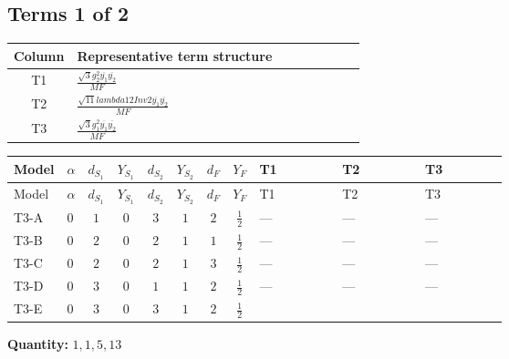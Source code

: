 \documentclass[8pt]{article}
\begin{document}
\begin{landscape}
\subsection*{Terms 1 of 2}
\begin{center}
\begin{tabular}{@{}c >{\raggedright\arraybackslash}p{0.82\linewidth}@{}}
\toprule
Column & Representative term structure \\
\midrule
T1 & \(\displaystyle \frac{\sqrt{3} g_{2}^{2} \overline{y_{1}} \overline{y_{2}}}{MF}\) \\
\midrule
T2 & \(\displaystyle \frac{\sqrt{11} lambda12Inv2 \overline{y_{1}} \overline{y_{2}}}{MF}\) \\
\midrule
T3 & \(\displaystyle \frac{\sqrt{3} g_{1}^{2} \overline{y_{1}} \overline{y_{2}}}{MF}\) \\
\midrule
\bottomrule
\end{tabular}
\end{center}
\smallskip
\tiny
\begin{longtable}{@{}llcccccc >{\raggedright\arraybackslash}p{0.21\linewidth} >{\raggedright\arraybackslash}p{0.21\linewidth} >{\raggedright\arraybackslash}p{0.21\linewidth}@{}}
\toprule
Model & $\alpha$ & $d_{S_1}$ & $Y_{S_1}$ & $d_{S_2}$ & $Y_{S_2}$ & $d_F$ & $Y_F$ & T1 & T2 & T3 \\
\midrule
\endfirsthead
\toprule
Model & $\alpha$ & $d_{S_1}$ & $Y_{S_1}$ & $d_{S_2}$ & $Y_{S_2}$ & $d_F$ & $Y_F$ & T1 & T2 & T3 \\
\midrule
\endhead
T3-A & $0$ & $1$ & $0$ & $3$ & $1$ & $2$ & $\frac{1}{2}$ & --- & --- & --- \\
\midrule
T3-B & $0$ & $2$ & $0$ & $2$ & $1$ & $1$ & $\frac{1}{2}$ & --- & --- & --- \\
\midrule
T3-C & $0$ & $2$ & $0$ & $2$ & $1$ & $3$ & $\frac{1}{2}$ & --- & --- & --- \\
\midrule
T3-D & $0$ & $3$ & $0$ & $1$ & $1$ & $2$ & $\frac{1}{2}$ & --- & --- & --- \\
\midrule
T3-E & $0$ & $3$ & $0$ & $3$ & $1$ & $2$ & $\frac{1}{2}$ & \scriptsize\adjustbox{max width=\linewidth}{$\begin{gathered} - \frac{11 \sqrt{3} g_{2}^{2} \overline{y_{1}} \overline{y_{2}}}{8 MF}\end{gathered}$} & \scriptsize\adjustbox{max width=\linewidth}{$\begin{gathered} - \frac{3 \sqrt{11} lambda12Inv2 \overline{y_{1}} \overline{y_{2}}}{22 MF}\end{gathered}$} & \scriptsize\adjustbox{max width=\linewidth}{$\begin{gathered} - \frac{\sqrt{3} g_{1}^{2} \overline{y_{1}} \overline{y_{2}}}{8 MF}\end{gathered}$} \\
\midrule
\bottomrule
\end{longtable}
\clearpage
\noindent\textbf{Quantity: }$\mathrm{1,1,5,13}$\par\smallskip

\end{landscape}
\end{document}
